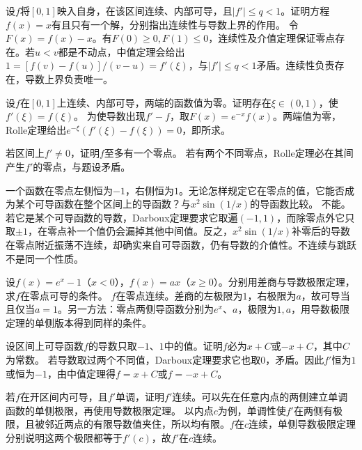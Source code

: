 设\(f\)将\([0,1]\)映入自身，在该区间连续、内部可导，且\(|f'|\le q<1\)。证明方程\(f(x)=x\)有且只有一个解，分别指出连续性与导数上界的作用。
\solutionanswer
令\(F(x)=f(x)-x\)。有\(F(0)\ge0,F(1)\le0\)，连续性及介值定理保证零点存在。若\(u<v\)都是不动点，中值定理会给出\(1=[f(v)-f(u)]/(v-u)=f'(\xi)\)，与\(|f'|\le q<1\)矛盾。连续性负责存在，导数上界负责唯一。


设\(f\)在\([0,1]\)上连续、内部可导，两端的函数值为零。证明存在\(\xi\in(0,1)\)，使\(f'(\xi)=f(\xi)\)。
\solutionanswer
为使导数出现\(f'-f\)，取\(F(x)=e^{-x}f(x)\)。两端值为零，Rolle定理给出\(e^{-\xi}(f'(\xi)-f(\xi))=0\)，即所求。


若区间上\(f'\ne0\)，证明\(f\)至多有一个零点。
\solutionanswer
若有两个不同零点，Rolle定理必在其间产生\(f'\)的零点，与题设矛盾。


一个函数在零点左侧恒为\(-1\)，右侧恒为\(1\)。无论怎样规定它在零点的值，它能否成为某个可导函数在整个区间上的导函数？与\(x^2\sin(1/x)\)的导函数比较。
\solutionanswer
不能。若它是某个可导函数的导数，Darboux定理要求它取遍\((-1,1)\)，而除零点外它只取\(\pm1\)，在零点补一个值仍会漏掉其他中间值。反之，\(x^2\sin(1/x)\)补零后的导数在零点附近振荡不连续，却确实来自可导函数，仍有导数的介值性。不连续与跳跃不是同一个性质。


设\(f(x)=e^x-1\)（\(x<0\)），\(f(x)=ax\)（\(x\ge0\)）。分别用差商与导数极限定理，求\(f\)在零点可导的条件。
\solutionanswer
\(f\)在零点连续。差商的左极限为\(1\)，右极限为\(a\)，故可导当且仅当\(a=1\)。另一方法：零点两侧导函数分别为\(e^x\)、\(a\)，极限为\(1,a\)，用导数极限定理的单侧版本得到同样的条件。


设区间上可导函数\(f\)的导数只取\(-1\)、\(1\)中的值。证明\(f\)必为\(x+C\)或\(-x+C\)，其中\(C\)为常数。
\solutionanswer
若导数取过两个不同值，Darboux定理要求它也取\(0\)，矛盾。因此\(f'\)恒为\(1\)或恒为\(-1\)，由中值定理得\(f=x+C\)或\(f=-x+C\)。


若\(f\)在开区间内可导，且\(f'\)单调，证明\(f'\)连续。可以先在任意内点的两侧建立单调函数的单侧极限，再使用导数极限定理。
\solutionanswer
以内点\(c\)为例，单调性使\(f'\)在两侧有极限，且被邻近两点的有限导数值夹住，所以均有限。\(f\)在\(c\)连续，单侧导数极限定理分别说明这两个极限都等于\(f'(c)\)，故\(f'\)在\(c\)连续。


